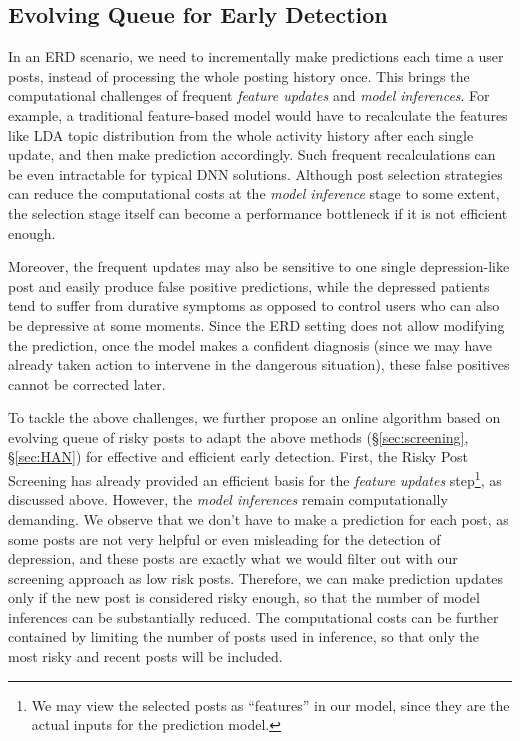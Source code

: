 \subsection{Evolving Queue for Early Detection}
\label{sec:evolving}

In an ERD scenario, we need to incrementally make predictions each time a user posts, instead of processing the whole posting history once.
This brings the computational challenges of frequent \textit{feature updates} and \textit{model inferences}. For example, a traditional feature-based model would have to recalculate the features like LDA topic distribution \cite{blei2003latent} from the whole activity history after each single update, and then make prediction accordingly. Such frequent recalculations can be even intractable for typical DNN solutions. Although post selection strategies can reduce the computational costs at the \textit{model inference} stage to some extent, the selection stage itself can become a performance bottleneck if it is not efficient enough. 

Moreover, the frequent updates may also be sensitive to one single depression-like post and easily produce false positive predictions, while the depressed patients tend to suffer from durative symptoms  \cite{kroenke2001phq} as opposed to control users who can also be depressive at some moments. Since the ERD setting does not allow modifying the prediction, once the model makes a confident diagnosis (since we may have already taken action to intervene in the dangerous situation), these false positives cannot be corrected later.

To tackle the above challenges, we further propose an online algorithm based on evolving queue of risky posts to adapt the above methods (\S \ref{sec:screening}, \S \ref{sec:HAN}) for effective and efficient early detection. First, the Risky Post Screening has already provided an efficient basis for the \textit{feature updates} step\footnote{We may view the selected posts as ``features'' in our model, since they are the actual inputs for the prediction model.}, as discussed above. However, the \textit{model inferences} remain computationally demanding. We observe that we don't have to make a prediction for each post, as some posts are not very helpful or even misleading for the detection of depression, and these posts are exactly what we would filter out with our screening approach as low risk posts. 
Therefore, we can make prediction updates only if the new post is considered 
risky enough, so that the number of model inferences can be substantially reduced. The computational costs can be further contained by limiting the number of posts used in inference, so that only the most risky and recent posts will be included.

